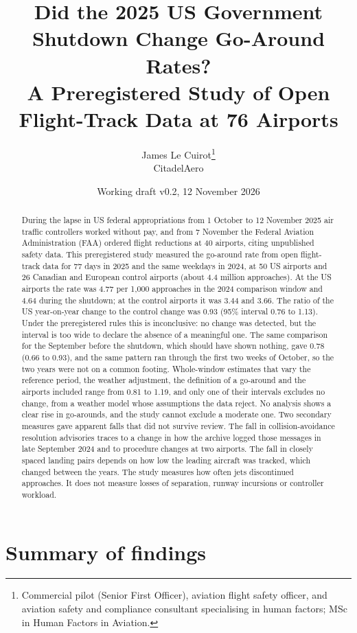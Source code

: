 \documentclass[11pt]{article}
\title{Did the 2025 US Government Shutdown Change Go-Around Rates?\texorpdfstring{\\}{} A Preregistered Study of Open Flight-Track Data at 76 Airports}
\author{James Le Cuirot\thanks{Commercial pilot (Senior First Officer), aviation flight safety officer, and aviation safety and compliance consultant specialising in human factors; MSc in Human Factors in Aviation.}\\[2pt] \normalsize CitadelAero}
\date{Working draft v0.2, 12 November 2026}
\begin{document}
\setlength{\emergencystretch}{1.5em}
\maketitle

\begin{abstract}
During the lapse in US federal appropriations from 1 October to 12 November 2025 air traffic controllers worked without pay, and from 7 November the Federal Aviation Administration (FAA) ordered flight reductions at 40 airports, citing unpublished safety data. This preregistered study measured the go-around rate from open flight-track data for 77 days in 2025 and the same weekdays in 2024, at 50 US airports and 26 Canadian and European control airports (about 4.4 million approaches). At the US airports the rate was 4.77 per 1,000 approaches in the 2024 comparison window and 4.64 during the shutdown; at the control airports it was 3.44 and 3.66. The ratio of the US year-on-year change to the control change was 0.93 (95\% interval 0.76 to 1.13). Under the preregistered rules this is inconclusive: no change was detected, but the interval is too wide to declare the absence of a meaningful one. The same comparison for the September before the shutdown, which should have shown nothing, gave 0.78 (0.66 to 0.93), and the same pattern ran through the first two weeks of October, so the two years were not on a common footing. Whole-window estimates that vary the reference period, the weather adjustment, the definition of a go-around and the airports included range from 0.81 to 1.19, and only one of their intervals excludes no change, from a weather model whose assumptions the data reject. No analysis shows a clear rise in go-arounds, and the study cannot exclude a moderate one. Two secondary measures gave apparent falls that did not survive review. The fall in collision-avoidance resolution advisories traces to a change in how the archive logged those messages in late September 2024 and to procedure changes at two airports. The fall in closely spaced landing pairs depends on how low the leading aircraft was tracked, which changed between the years. The study measures how often jets discontinued approaches. It does not measure losses of separation, runway incursions or controller workload.
\end{abstract}

\section{Summary of findings}\label{sec:summary}
\end{document}
